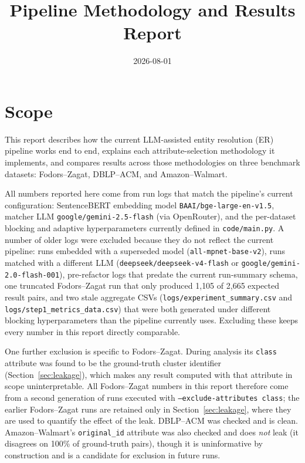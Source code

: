 \documentclass[11pt]{article}
\title{Pipeline Methodology and Results Report}
\author{}
\date{2026-08-01}
\begin{document}
\maketitle

\section{Scope}

This report describes how the current LLM-assisted entity resolution (ER) pipeline
works end to end, explains each attribute-selection methodology it implements, and
compares results across those methodologies on three benchmark datasets:
Fodors--Zagat, DBLP--ACM, and Amazon--Walmart.

All numbers reported here come from run logs that match the pipeline's current
configuration: SentenceBERT embedding model \texttt{BAAI/bge-large-en-v1.5}, matcher
LLM \texttt{google/gemini-2.5-flash} (via OpenRouter), and the per-dataset blocking
and adaptive hyperparameters currently defined in \texttt{code/main.py}. A number of
older logs were excluded because they do not reflect the current pipeline: runs
embedded with a superseded model (\texttt{all-mpnet-base-v2}), runs matched with a
different LLM (\texttt{deepseek/deepseek-v4-flash} or \texttt{google/gemini-2.0-flash-001}),
pre-refactor logs that predate the current run-summary schema, one truncated
Fodors--Zagat run that only produced 1{,}105 of 2{,}665 expected result pairs, and two
stale aggregate CSVs (\texttt{logs/experiment\_summary.csv} and
\texttt{logs/step1\_metrics\_data.csv}) that were both generated under different
blocking hyperparameters than the pipeline currently uses. Excluding these keeps
every number in this report directly comparable.

One further exclusion is specific to Fodors--Zagat. During analysis its
\texttt{class} attribute was found to be the ground-truth cluster identifier
(Section~\ref{sec:leakage}), which makes any result computed with that attribute in
scope uninterpretable. All Fodors--Zagat numbers in this report therefore come from
a second generation of runs executed with \texttt{--exclude-attributes class}; the
earlier Fodors--Zagat runs are retained only in Section~\ref{sec:leakage}, where
they are used to quantify the effect of the leak. DBLP--ACM was checked and is
clean. Amazon--Walmart's \texttt{original\_id} attribute was also checked and does
\emph{not} leak (it disagrees on 100\% of ground-truth pairs), though it is
uninformative by construction and is a candidate for exclusion in future runs.
\end{document}
